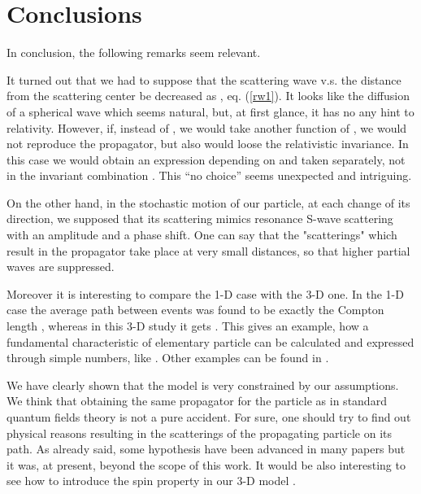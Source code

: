 \documentclass[a4paper,12pt]{article}
\begin{document}
\section{Conclusions}
In conclusion, the following remarks seem relevant.

     It turned out that we had to suppose that the scattering
     wave v.s. the distance \coordHE{} from the scattering center be decreased
as \coordHE{}, eq. (\ref{rw1}).
     It looks like the diffusion of a spherical wave which seems  natural,
but, at first glance, it has no any hint to relativity.
However, if, instead of \coordHE{}, we would take another function of \coordHE{}, we
would not reproduce the propagator, but also would loose the relativistic
invariance. In this case we would obtain an expression depending on \coordHE{} and
\coordHE{} taken separately, not in the invariant combination \coordHE{}.
This ``no choice'' seems unexpected and intriguing.

      On the other hand, in the stochastic motion of our particle, at each
change of its direction, we supposed that its scattering mimics
resonance S-wave scattering with an amplitude \coordHE{} and a \coordHE{} phase shift. One can say that the "scatterings" which result in
the propagator take place at very small distances, so that higher
partial waves are suppressed.


     Moreover it is interesting to compare the 1-D case with the 3-D one.
     In the 1-D case the average path
between events was found to be exactly the Compton length
\coordHE{}, whereas in this 3-D study it gets
\coordHE{}. This gives
an example, how a  fundamental characteristic of elementary
particle can be calculated and expressed through simple  numbers,
like \coordHE{}. Other examples can be found in
\cite{P.Noyes}.

    We have clearly shown that the model is very constrained by our
assumptions. We
think that obtaining the same propagator for the particle as in
standard  quantum
fields theory is not a pure accident. For sure, one should try to find
out physical reasons resulting in the scatterings of the propagating particle
on its path. As already said, some  hypothesis have been advanced in many
papers but it was, at present, beyond the scope of this work.  It would be also
interesting to see how to introduce the spin property in our 3-D model .
\bigskip
\end{document}
